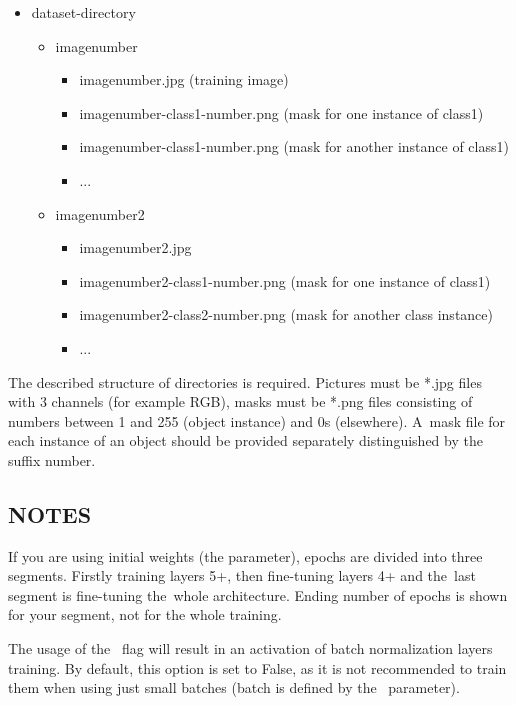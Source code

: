 \liststyleLi
\begin{itemize}
\item dataset-directory
\begin{itemize}
\item imagenumber 

\begin{itemize}
\item imagenumber.jpg (training image) 
\item imagenumber-class1-number.png (mask for one instance of class1) 
\item imagenumber-class1-number.png (mask for another instance of class1) 
\item ... 
\end{itemize}
\item imagenumber2 

\begin{itemize}
\item imagenumber2.jpg 
\item imagenumber2-class1-number.png (mask for one instance of class1) 
\item imagenumber2-class2-number.png (mask for another class instance) 
\item ... 
\end{itemize}
\end{itemize}
\end{itemize}

The described structure of directories is required. Pictures must be *.jpg
files with 3 channels (for example RGB), masks must be *.png files consisting
of numbers between 1 and 255 (object instance) and 0s (elsewhere). A~mask file
for each instance of an object should be provided separately distinguished by
the suffix number. 

\subsection*{NOTES}
If you are using initial weights (the  parameter),
epochs are divided into three segments. Firstly training layers 5+, then
fine-tuning layers 4+ and the~last segment is fine-tuning the~whole
architecture. Ending number of epochs is shown for your segment, not for the
whole training. 

The usage of the~ flag will result in an activation of
batch normalization layers training. By default, this option is set to False,
as it is not recommended to train them when using just small batches (batch is
defined by the~ parameter). 

